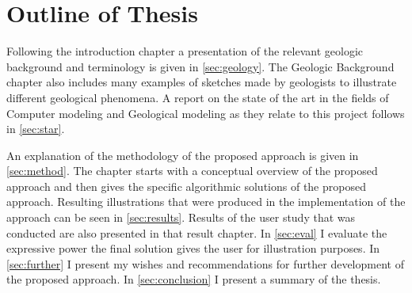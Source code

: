 \documentclass[a4paper,12pt]{report}
\newcommand{\secref}[1]{\autoref{#1}}
\begin{document}
\section{Outline of Thesis}

Following the introduction chapter a presentation of the relevant geologic background and terminology is given in \secref{sec:geology}. The Geologic Background chapter also includes many examples of sketches made by geologists to illustrate different geological phenomena. A report on the state of the art in the fields of Computer modeling and Geological modeling as they relate to this project follows in \secref{sec:star}.

An explanation of the methodology of the proposed approach is given in \secref{sec:method}. The chapter starts with a conceptual overview of the proposed approach and then gives the specific algorithmic solutions of the proposed approach. Resulting illustrations that were produced in the implementation of the approach can be seen in \secref{sec:results}. Results of the user study that was conducted are also presented in that result chapter. In \secref{sec:eval} I evaluate the expressive power the final solution gives the user for illustration purposes. In \secref{sec:further} I present my wishes and recommendations for further development of the proposed approach. In \secref{sec:conclusion} I present a summary of the thesis.



% 
% 	
% 	
	

\clearpage
\end{document}
